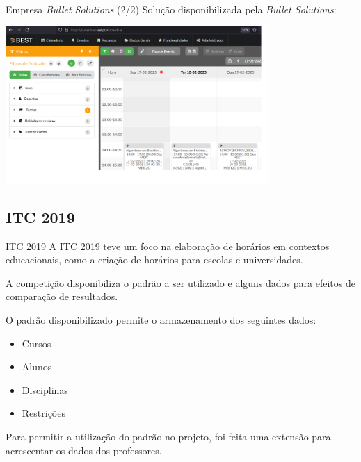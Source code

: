 \documentclass[aspectratio=169]{beamer}
\begin{document}
    \begin{frame}{Empresa \textit{Bullet Solutions} (2/2)}
        \justifying
        Solução disponibilizada pela \textit{Bullet Solutions}:
        \begin{center}
            \includegraphics[width=10cm]{img/exemplo-bullet-solutions-software.png}
        \end{center}
    \end{frame}
    
    \subsection{ITC 2019}

    \begin{frame}{ITC 2019}
        \justifying
        A ITC 2019 teve um foco na elaboração de horários em contextos educacionais, como a criação de horários para escolas e universidades.

        \vfill
        
        A competição disponibiliza o padrão a ser utilizado e alguns dados para efeitos de comparação de resultados.

        \vfill
        
        O padrão disponibilizado permite o armazenamento dos seguintes dados:
        \begin{itemize}
            \item Cursos
            \item Alunos
            \item Disciplinas
            \item Restrições
        \end{itemize}

        \vfill

        Para permitir a utilização do padrão no projeto, foi feita uma extensão para acrescentar os dados dos professores.
    \end{frame}
\end{document}
